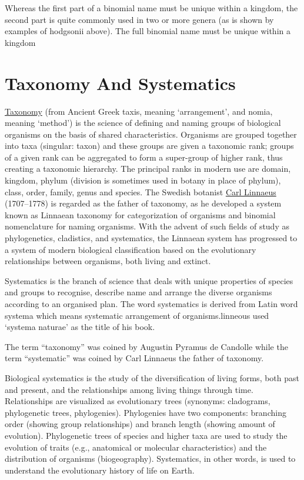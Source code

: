 Whereas the first part of a binomial name must be unique within a kingdom, the second part is quite commonly used in two or more genera (as is shown by examples of hodgsonii above). The full binomial name must be unique within a kingdom

\hypertarget{taxonomy-and-systematics}{%
\section{Taxonomy And Systematics}\label{taxonomy-and-systematics}}

\href{https://en.wikipedia.org/wiki/Taxonomy_(biology)}{Taxonomy} (from Ancient Greek taxis, meaning `arrangement', and nomia, meaning `method') is the science of defining and naming groups of biological organisms on the basis of shared characteristics. Organisms are grouped together into taxa (singular: taxon) and these groups are given a taxonomic rank; groups of a given rank can be aggregated to form a super-group of higher rank, thus creating a taxonomic hierarchy. The principal ranks in modern use are domain, kingdom, phylum (division is sometimes used in botany in place of phylum), class, order, family, genus and species. The Swedish botanist \href{https://en.wikipedia.org/wiki/Carl_Linnaeus}{Carl Linnaeus} (1707--1778) is regarded as the father of taxonomy, as he developed a system known as Linnaean taxonomy for categorization of organisms and binomial nomenclature for naming organisms. With the advent of such fields of study as phylogenetics, cladistics, and systematics, the Linnaean system has progressed to a system of modern biological classification based on the evolutionary relationships between organisms, both living and extinct.

Systematics is the branch of science that deals with unique properties of species and groups to recognise, describe name and arrange the diverse organisms according to an organised plan. The word systematics is derived from Latin word systema which means systematic arrangement of organisms.linneous used `systema naturae' as the title of his book.

The term ``taxonomy'' was coined by Augustin Pyramus de Candolle while the term ``systematic'' was coined by Carl Linnaeus the father of taxonomy.

Biological systematics is the study of the diversification of living forms, both past and present, and the relationships among living things through time. Relationships are visualized as evolutionary trees (synonyms: cladograms, phylogenetic trees, phylogenies). Phylogenies have two components: branching order (showing group relationships) and branch length (showing amount of evolution). Phylogenetic trees of species and higher taxa are used to study the evolution of traits (e.g., anatomical or molecular characteristics) and the distribution of organisms (biogeography). Systematics, in other words, is used to understand the evolutionary history of life on Earth.

